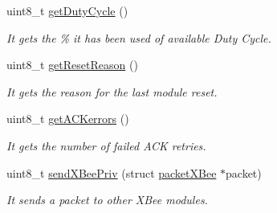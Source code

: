 \begin{DoxyCompactItemize}
uint8\+\_\+t \hyperlink{class_wasp_x_bee868_acaa42fab63cd92f65702d9320f6345bd}{get\+Duty\+Cycle} ()
\begin{DoxyCompactList}\small\item\em It gets the \% it has been used of available Duty Cycle. \end{DoxyCompactList}\item 
uint8\+\_\+t \hyperlink{class_wasp_x_bee868_abc2a76ce0734ba97b4c7a9906c163bca}{get\+Reset\+Reason} ()
\begin{DoxyCompactList}\small\item\em It gets the reason for the last module reset. \end{DoxyCompactList}\item 
uint8\+\_\+t \hyperlink{class_wasp_x_bee868_a9dedb1e64024e59cd3e394dfe19060de}{get\+A\+C\+Kerrors} ()
\begin{DoxyCompactList}\small\item\em It gets the number of failed A\+CK retries. \end{DoxyCompactList}\item 
uint8\+\_\+t \hyperlink{class_wasp_x_bee868_a424c5b0f0dabe161e80089a6d472ace9}{send\+X\+Bee\+Priv} (struct \hyperlink{structpacket_x_bee}{packet\+X\+Bee} $\ast$packet)
\begin{DoxyCompactList}\small\item\em It sends a packet to other X\+Bee modules. \end{DoxyCompactList}\end{DoxyCompactItemize}
